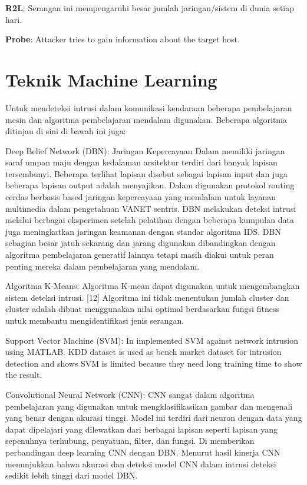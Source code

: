 \documentclass[conference]{IEEEtran}
\begin{document}
\textbf{R2L}: Serangan ini mempengaruhi besar jumlah jaringan/sistem di dunia setiap hari.

\textbf{Probe}: Attacker tries to gain information about 
the target host.

\section{Teknik Machine Learning}
Untuk mendeteksi intrusi dalam komunikasi kendaraan beberapa
pembelajaran mesin dan algoritma pembelajaran mendalam digunakan.
Beberapa algoritma ditinjau di sini di bawah ini juga:

Deep Belief Network (DBN): Jaringan Kepercayaan Dalam
memiliki jaringan saraf umpan maju dengan kedalaman
arsitektur terdiri dari banyak lapisan tersembunyi. Beberapa terlihat
lapisan disebut sebagai lapisan input dan juga beberapa lapisan output adalah
menyajikan. Dalam \cite{olusola2010analysis} digunakan protokol routing cerdas berbasis based
jaringan kepercayaan yang mendalam untuk layanan multimedia dalam pengetahuan
VANET sentris. DBN melakukan deteksi intrusi
melalui berbagai eksperimen setelah pelatihan dengan beberapa
kumpulan data juga meningkatkan jaringan keamanan dengan standar
algoritma IDS. DBN sebagian besar jatuh sekarang dan
jarang digunakan dibandingkan dengan algoritma pembelajaran generatif lainnya
tetapi masih diakui untuk peran penting mereka dalam pembelajaran yang mendalam.

Algoritma K-Means: Algoritma K-mean dapat digunakan
untuk mengembangkan sistem deteksi intrusi. [12]\cite{zhang2018intelligent} Algoritma ini
tidak menentukan jumlah cluster dan cluster adalah
dibuat menggunakan nilai optimal berdasarkan fungsi fitness untuk
membantu mengidentifikasi jenis serangan.

Support Vector Machine (SVM): In \cite{sukumar2018network} implemented 
SVM against network intrusion using MATLAB. KDD 
dataset is used as bench market dataset for intrusion 
detection and shows SVM is limited because they need long 
training time to show the result. 

Convolutional Neural Network (CNN): CNN sangat dalam
algoritma pembelajaran yang digunakan untuk mengklasifikasikan gambar dan mengenali
yang benar dengan akurasi tinggi. Model ini terdiri dari
neuron dengan data yang dapat dipelajari yang dilewatkan dari berbagai lapisan
seperti lapisan yang sepenuhnya terhubung, penyatuan, filter, dan fungsi. Di
\cite{lahre2013analyze} memberikan perbandingan deep learning CNN dengan DBN.
Menurut hasil kinerja CNN menunjukkan bahwa
akurasi dan deteksi model CNN dalam intrusi
deteksi sedikit lebih tinggi dari model DBN.
\end{document}
